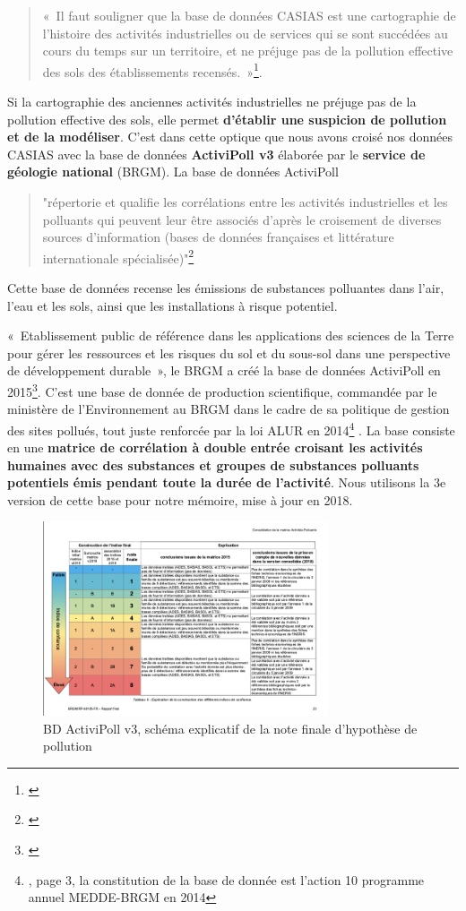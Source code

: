 \documentclass[a4paper,twoside,12pt]{book}
\begin{document}
\begin{quote}
« Il faut souligner que la base de données CASIAS est une cartographie de l’histoire des activités industrielles ou de services qui se sont succédées au cours du temps sur un territoire, et ne préjuge pas de la pollution effective des sols des établissements recensés. »\footnote{\cite{brgm_casias_nodate}}. 
\end{quote}
Si la cartographie des anciennes activités industrielles ne préjuge pas de la pollution effective des sols, elle permet \textbf{d’établir une suspicion de pollution et de la modéliser}. C’est dans cette optique que nous avons croisé nos données CASIAS avec la base de données \textbf{ActiviPoll v3} élaborée par le \textbf{service de géologie national} (BRGM). La base de données ActiviPoll \begin{quote}"répertorie et qualifie les corrélations entre les activités industrielles et les polluants qui peuvent leur être associés d'après le croisement de diverses sources d'information (bases de données françaises et littérature internationale spécialisée)"\footnote{\cite{brgm_bd_nodate}}\end{quote} Cette base de données recense les émissions de substances polluantes dans l'air, l'eau et les sols, ainsi que les installations à risque potentiel. 

« Etablissement public de référence dans les applications des sciences de la Terre pour gérer les ressources et les risques du sol et du sous-sol dans une perspective de développement durable », le BRGM a créé la base de données ActiviPoll en 2015\footnote{\cite{brgm_bd_nodate}}. C'est une base de donnée de production scientifique, commandée par le ministère de l'Environnement au BRGM dans le cadre de sa politique de gestion des sites pollués, tout juste renforcée par la loi ALUR en 2014\footnote{\cite{aubert_n_elaboration_2014}, page 3, la constitution de la base de donnée est l'action 10 programme annuel MEDDE-BRGM en 2014} . La base consiste en une \textbf{matrice de corrélation à double entrée croisant les activités humaines avec des substances et groupes de substances polluants potentiels émis pendant toute la durée de l'activité}. Nous utilisons la 3e version de cette base pour notre mémoire, mise à jour en 2018. 

\begin{figure}[!h]
\centering 
\includegraphics[width=0.75\textwidth]{img/chapitre3/BRGM_ActiviPol_Tableau}
\caption{BD ActiviPoll v3, schéma explicatif de la note finale d'hypothèse de pollution}
\end{figure}
\end{document}
